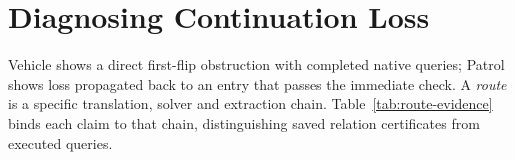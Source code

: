 \section{Diagnosing Continuation Loss}\label{sec:evaluation}
Vehicle shows a direct first-flip obstruction with completed native
queries; Patrol shows loss propagated back to an entry that passes the
immediate check. A \emph{route} is a specific translation, solver and
extraction chain. Table~\ref{tab:route-evidence} binds each claim to that
chain, distinguishing saved relation certificates from executed queries.




